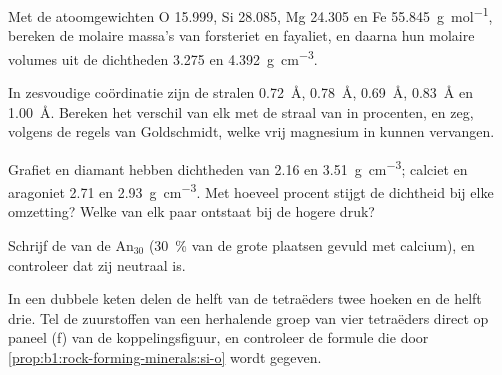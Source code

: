 \begin{exercise}[$\star$]\label{exo:b1:rock-forming-minerals:2}
Met de atoomgewichten O \num{15.999}, Si \num{28.085}, Mg \num{24.305} en Fe \qty{55.845}{g.mol^{-1}}, bereken de molaire massa's
van forsteriet en fayaliet, en daarna hun molaire volumes uit de dichtheden \num{3.275} en \qty{4.392}{g.cm^{-3}}.
\end{exercise}

\begin{exercise}[$\star$]\label{exo:b1:rock-forming-minerals:3}
In zesvoudige coördinatie zijn de stralen  \qty{0.72}{\angstrom},  \qty{0.78}{\angstrom}, 
\qty{0.69}{\angstrom},  \qty{0.83}{\angstrom} en  \qty{1.00}{\angstrom}. Bereken het verschil van elk met de straal
van  in procenten, en zeg, volgens de regels van Goldschmidt, welke vrij magnesium in  kunnen vervangen.
\end{exercise}

\begin{exercise}[$\star$]\label{exo:b1:rock-forming-minerals:4}
Grafiet en diamant hebben dichtheden van \num{2.16} en \qty{3.51}{g.cm^{-3}}; calciet en aragoniet \num{2.71} en \qty{2.93}{g.cm^{-3}}.
Met hoeveel procent stijgt de dichtheid bij elke omzetting? Welke  van elk paar ontstaat bij de hogere druk?
\end{exercise}

\begin{exercise}[$\star\star$]\label{exo:b1:rock-forming-minerals:5}
Schrijf de  van de  $\text{An}_{30}$ (\qty{30}{\percent} van de grote plaatsen gevuld met calcium), en
controleer dat zij neutraal is.
\end{exercise}

\begin{exercise}[$\star\star$]\label{exo:b1:rock-forming-minerals:6}
In een dubbele keten delen de helft van de tetraëders twee hoeken en de helft drie. Tel de zuurstoffen van een herhalende groep van vier
tetraëders direct op paneel (f) van de koppelingsfiguur, en controleer de formule  die door
\cref{prop:b1:rock-forming-minerals:si-o} wordt gegeven.
\end{exercise}

